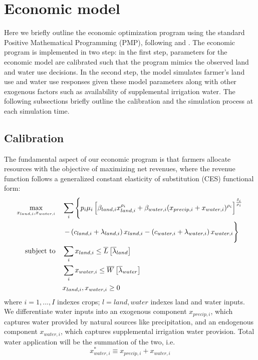 \section{Economic model}
\label{app:economic_model}

Here we briefly outline the economic optimization program using the standard Positive Mathematical Programming (PMP), following \citet{Howitt1995, Merel2011b} and \citet{Garnache2017}. The economic program is implemented in two step: in the first step, parameters for the economic model are calibrated such that the program mimics the observed land and water use decisions. In the second step, the model simulates farmer's land use and water use responses given these model parameters along with other exogenous factors such as availability of supplemental irrigation water. The following subsections briefly outline the calibration and the simulation process at each simulation time. 

\subsection{Calibration}
\label{app:economic_model_calib}
The fundamental aspect of our economic program is that farmers allocate resources with the objective of maximizing net revenues, where the revenue function follows a generalized constant elasticity of substitution (CES) functional form: 
\begin{equation}\label{eq:econ_calibration}
    \begin{split}
    \max _ { x _ { land,i } , x _ { water,i } } & \quad \sum _ { i } \left\{ p _ { i } \mu _ { i } \left[ \beta _ { land,i } x _ { land,i } ^ { \rho _ { i } } + \beta _ { water,i } (x_{precip,i} + x _ { water,i }) ^ {\rho _ { i } } \right] ^ { \frac { \delta _ { i } } { \rho _ { i } } } \right.\\
    & \left. \quad - \left( c _ { land,i } + \lambda _ { land,i } \right) x _ { land,i } - \left( c _ { water,i } + \lambda _ { water,i } \right) x _ { water,i } \vphantom{\sum_i} \right\} \\
    \text{subject to} & \quad \sum _ { i } x _ { land,i } \leq \overline { L } \left[ \overline { \lambda } _ { land } \right] \\ 
    & \quad \sum _ { i } x _ { water,i } \leq \overline { W } \left[ \overline { \lambda } _ { water } \right] \\
    & \quad x_{land,i}, x_{water,i} \geq 0 \\
    \end{split}
\end{equation}
where $i = 1,...,I$ indexes crops; $l=land,water$ indexes land and water inputs. We differentiate water inputs into an exogenous component $x_{precip,i}$, which captures water provided by natural sources like precipitation, and an endogenous component $x_{water,i}$, which captures supplemental irrigation water provision. Total water application will be the summation of the two, i.e.
\begin{equation*}
    x^*_{water,i} \equiv x_{precip,i} + x_{water,i}
\end{equation*}

